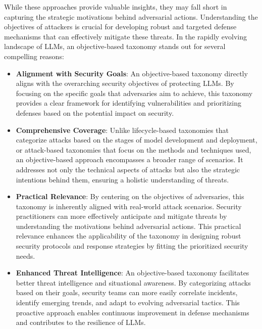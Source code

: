 While these approaches provide valuable insights, they may fall short in capturing the strategic motivations behind adversarial actions. Understanding the objectives of attackers is crucial for developing robust and targeted defense mechanisms that can effectively mitigate these threats. In the rapidly evolving landscape of LLMs, an objective-based taxonomy stands out for several compelling reasons:
\begin{itemize}
    \item{\bf Alignment with Security Goals}: An objective-based taxonomy directly aligns with the overarching security objectives of protecting LLMs. By focusing on the specific goals that adversaries aim to achieve, this taxonomy provides a clear framework for identifying vulnerabilities and prioritizing defenses based on the potential impact on security. 

    \item{\bf Comprehensive Coverage}: Unlike lifecycle-based taxonomies that categorize attacks based on the stages of model development and deployment, or attack-based taxonomies that focus on the methods and techniques used, an objective-based approach encompasses a broader range of scenarios. It addresses not only the technical aspects of attacks but also the strategic intentions behind them, ensuring a holistic understanding of threats.

    \item{\bf Practical Relevance}: By centering on the objectives of adversaries, this taxonomy is inherently aligned with real-world attack scenarios. Security practitioners can more effectively anticipate and mitigate threats by understanding the motivations behind adversarial actions. This practical relevance enhances the applicability of the taxonomy in designing robust security protocols and response strategies by fitting the prioritized security needs.

    \item{\bf Enhanced Threat Intelligence}: An objective-based taxonomy facilitates better threat intelligence and situational awareness. By categorizing attacks based on their goals, security teams can more easily correlate incidents, identify emerging trends, and adapt to evolving adversarial tactics. This proactive approach enables continuous improvement in defense mechanisms and contributes to the resilience of LLMs.
\end{itemize}
